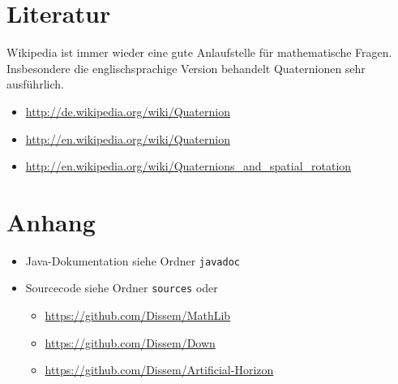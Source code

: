\documentclass[12pt]{article}
\begin{document}
  \section{Literatur}

  Wikipedia ist immer wieder eine gute Anlaufstelle für mathematische Fragen. Insbesondere die englischsprachige Version behandelt Quaternionen sehr ausführlich.

  \begin{itemize}
    \item \url{http://de.wikipedia.org/wiki/Quaternion}
    \item \url{http://en.wikipedia.org/wiki/Quaternion}
    \item \url{http://en.wikipedia.org/wiki/Quaternions_and_spatial_rotation}
  \end{itemize}

  \section{Anhang}

  \begin{itemize}
    \item Java-Dokumentation siehe Ordner \texttt{javadoc}
    \item Sourcecode siehe Ordner \texttt{sources} oder
    \begin{itemize}
      \item \url{https://github.com/Dissem/MathLib}
      \item \url{https://github.com/Dissem/Down}
      \item \url{https://github.com/Dissem/Artificial-Horizon}
    \end{itemize}
  \end{itemize}
\end{document}
